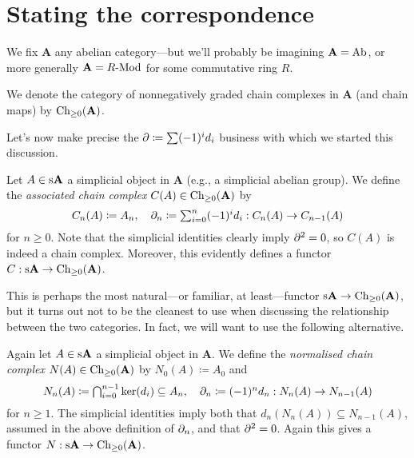 
\renewcommand{\A}{\mathbf{A}}

\section{Stating the correspondence}

We fix $\A$ any abelian category---but we'll probably be imagining $\A
= \Ab$, or more generally $\A = R\text{-}\Mod$ for some commutative
ring $R$.

\begin{notation}
  We denote the category of nonnegatively graded chain complexes in
  $\A$ (and chain maps) by $\Ch_{\ge 0}(\A)$.
\end{notation}

Let's now make precise the $\partial \coloneqq \sum (-1)^i d_i$ business
with which we started this discussion.

\begin{definition}
  Let $A \in \s\A$ a simplicial object in $\A$ (e.g., a simplicial
  abelian group). We define the \textit{associated chain complex}
  $C(A) \in \Ch_{\ge 0}(\A)$ by
  \[
  \textstyle{C_n(A) \coloneqq A_n, \quad \partial_n \coloneqq \sum_{i=0}^n
    (-1)^i d_i : C_n(A) \to C_{n-1}(A)}
  \]
  for $n \ge 0$. Note that the simplicial identities clearly imply
  $\partial^2 = 0$, so $C(A)$ is indeed a chain complex. Moreover, this
  evidently defines a functor $C : \s\A \to \Ch_{\ge 0}(\A)$.
\end{definition}

This is perhaps the most natural---or familiar, at least---functor
$\s\A \to \Ch_{\ge 0}(\A)$, but it turns out not to be the cleanest to
use when discussing the relationship between the two categories. In
fact, we will want to use the following alternative.

\begin{definition}
  Again let $A \in \s\A$ a simplicial object in $\A$. We define the
  \textit{normalised chain complex} $N(A) \in \Ch_{\ge 0}(\A)$ by
  $N_0(A) \coloneqq A_0$ and
  \[
  \textstyle{N_n(A) \coloneqq
    \bigcap_{i=0}^{n-1} \ker(d_i) \subseteq A_n, \quad \partial_n
    \coloneqq (-1)^n d_n : N_n(A) \to N_{n-1}(A)}
  \]
  for $n \ge 1$. The simplicial identities imply both that
  $d_n(N_n(A)) \subseteq N_{n-1}(A)$, assumed in the above definition
  of $\partial_n$, and that $\partial^2 = 0$. Again this gives a functor $N :
  \s\A \to \Ch_{\ge 0}(\A)$.
\end{definition}

